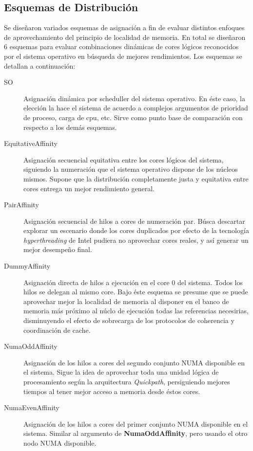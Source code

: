 \subsection{Esquemas de Distribución}
Se diseñaron variados esquemas de asignación a fin de evaluar distintos enfoques de aprovechamiento del principio de localidad de memoria. En total se diseñaron 6 esquemas para evaluar combinaciones dinámicas de cores lógicos reconocidos por el sistema operativo en búsqueda de mejores rendimientos. Los esquemas se detallan a continuación:
\begin{description}
\item[SO] Asignación dinámica por scheduller del sistema operativo. En éste caso, la elección la hace el sistema de acuerdo a complejos argumentos de prioridad de proceso, carga de cpu, etc. Sirve como punto base de comparación con respecto a los demás esquemas.
\item[EquitativeAffinity] Asignación secuencial equitativa entre los cores lógicos del sistema, siguiendo la numeración que el sistema operativo dispone de los núcleos mismos. Supone que la distribución completamente justa y equitativa entre cores entrega un mejor rendimiento general.
\item[PairAffinity] Asignación secuencial de hilos a cores de numeración par. Búsca descartar explorar un escenario donde los cores duplicados por efecto de la tecnología \emph{hyperthreading} de Intel pudiera no aprovechar cores reales, y así generar un mejor desempeño final.
\item[DummyAffinity] Asignación directa de hilos a ejecución en el core 0 del sistema. Todos los hilos se delegan al mismo core. Bajo éste esquema se presume que se puede aprovechar mejor la localidad de memoria al disponer en el banco de memoria más próximo al núclo de ejecución todas las referencias necesirias, disminuyendo el efecto de sobrecarga de los protocolos de coherencia y coordinación de cache.
\item[NumaOddAffinity] Asignación de los hilos a cores del segundo conjunto NUMA disponible en el sistema. Sigue la idea de aprovechar toda una unidad lógica de procesamiento según la arquitectura \emph{Quickpath}, persiguiendo mejores tiempos al tener mejor acceso a memoria desde éstos cores.
\item[NumaEvenAffinity] Asignación de los hilos a cores del primer conjunto NUMA disponible en el sistema. Similar al argumento de \textbf{NumaOddAffinity}, pero usando el otro nodo NUMA disponible.
\end{description}

